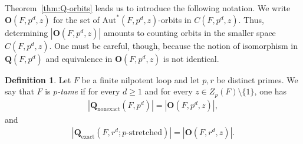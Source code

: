 \documentclass[12pt,a4paper]{amsart}
\theoremstyle{definition}
\newtheorem{definition}[theorem]{Definition}
\newcommand{\boldQ}{\mathbf{Q}}
\newcommand{\boldO}{\mathbf{O}}
\newcommand{\boldQexact}{\mathbf{Q}_{\mathrm{exact}}}
\newcommand{\boldQnonexact}{\mathbf{Q}_{\mathrm{nonexact}}}
\begin{document}
Theorem~\ref{thm:Q-orbits} leads us to introduce the following notation. We write $\boldO(F,p^d,z)$ for the set of $\mathrm{Aut}^{\!*}(F,p^d,z)$-orbits in $C(F,p^d,z)$. Thus, determining $|\boldO(F,p^{d},z)|$ amounts to counting orbits in the smaller space $C(F,p^{d},z)$. One must be careful, though, because the notion of isomorphism in $\boldQ(F,p^d)$ and equivalence in $\boldO(F,p^d,z)$ is not identical. 


\begin{definition}\label{def:ptame}
Let $F$ be a finite nilpotent loop and let $p,r$ be distinct primes.
We say that $F$ is \textit{$p$-tame} if for every $d\ge 1$ and for every $z\in Z_{p}(F)\setminus\{1\}$, one has
\begin{align} \label{eq:p-tame}
|\boldQnonexact(F,p^{d})|=|\boldO(F,p^{d},z)|,
\end{align}
and 
\begin{align} \label{eq:p-r-tame}
|\boldQexact(F,r^{d}; \text{$p$-stretched})|=|\boldO(F,r^{d},z)|.
\end{align}
\end{definition}
\end{document}

